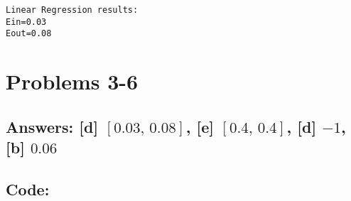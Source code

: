 \documentclass[11pt]{article}
\begin{document}
    \begin{Verbatim}[commandchars=\\\{\}]
Linear Regression results:
Ein=0.03
Eout=0.08
    \end{Verbatim}

    \hypertarget{problems-3-6}{%
\section{Problems 3-6}\label{problems-3-6}}

\hypertarget{answers-d-0.030.08-e-0.40.4-d--1-b-0.06}{%
\subsection{\texorpdfstring{Answers: {[}d{]} \([0.03,\,0.08]\),
{[}e{]} \([0.4,\,0.4]\), {[}d{]} \(-1\), {[}b{]}
\(0.06\)}{Answers: {[}d{]} {[}0.03,\textbackslash{},0.08{]}, {[}e{]} {[}0.4,\textbackslash{},0.4{]}, {[}d{]} -1, {[}b{]} 0.06}}\label{answers-d-0.030.08-e-0.40.4-d--1-b-0.06}}

\hypertarget{code}{%
\subsection{Code:}\label{code}}
\end{document}
